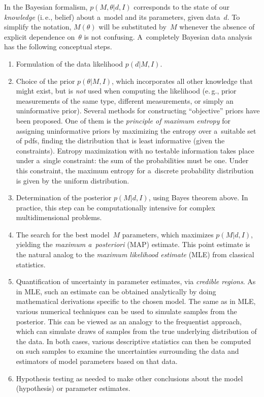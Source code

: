 \begin{multicols}{2}
  In the Bayesian formalism, $p(M, \theta\vert d, I)$ corresponds to the state of our \textit{knowledge} (i.\,e., belief) about a~model and its parameters, given data~$d$. To simplify the notation, $M(\theta)$ will be substituted by~$M$ whenever the
absence of explicit dependence on~$\theta$ is not confusing.
A~completely Bayesian data analysis has the following conceptual steps.
  \begin{enumerate}[1.]
\item Formulation of the data likelihood $p(d\vert M, I)$.\\[-14pt]
\item Choice of the prior $p(\theta\vert M,I)$, which incorporates all other
knowledge that might exist, but is \textit{not} used when computing the likelihood
(e.\,g., prior measurements of the same type, different measurements, or simply an
uninformative prior). Several methods for constructing ``objective'' priors have
been proposed. One of them is the \textit{principle of maximum entropy} for
assigning uninformative priors by maximizing the entropy over a~suitable set of
pdfs, finding the distribution that is least informative (given the constraints).
Entropy maximization with no testable information takes place under a~single
constraint: the sum of the probabilities must be one. Under this constraint, the
maximum entropy for a~discrete probability distribution is given by the uniform
distribution.\\[-14pt]
\item Determination of the posterior $p(M\vert d, I)$, using Bayes theorem above.
In practice, this step can be computationally intensive for complex
multidimensional problems.\\[-14pt]
\item The search for the best model~$M$ parameters, which maximizes $p(M\vert
d, I)$, yielding the \textit{maximum a~posteriori} (MAP) estimate. This point
estimate is the natural analog to the \textit{maximum likelihood estimate} (MLE)
from classical statistics.\\[-14pt]
\item Quantification of uncertainty in parameter estimates, via \textit{credible
regions}. As in MLE, such an estimate can be obtained analytically by doing
mathematical derivations specific to the chosen model. The same as in MLE, various
numerical techniques can be used to simulate samples from the posterior. This can be viewed as an analogy to the frequentist approach, which can simulate draws of samples from the true underlying distribution of the data. In both cases, various descriptive statistics can then be computed on such samples to examine the
uncertainties surrounding the data and estimators of
model parameters based on that data.\\[-14pt]
\item Hypothesis testing as needed to make other conclusions about the model
(hypothesis) or parameter estimates.
\end{enumerate}


\end{multicols}
